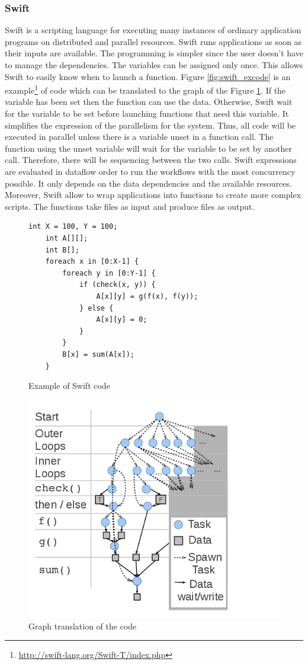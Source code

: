 \subsubsection{Swift}
Swift \cite{ZHCFL2007} \cite{WHWCK2011} is a scripting language for executing many instances of ordinary application programs on distributed and parallel resources.
Swift runs applications as soon as their inputs are available.
The programming is simpler since the user doesn't have to manage the dependencies.
The variables can be assigned only once.
This allows Swift to easily know when to launch a function.
Figure \ref{fig:swift_excode} is an example\footnote{\url{http://swift-lang.org/Swift-T/index.php}} of code which can be translated to the graph of the Figure \ref{fig:swift_exgraph}.
If the variable has been set then the function can use the data.
Otherwise, Swift wait for the variable to be set before launching functions that need this variable.
It simplifies the expression of the parallelism for the system.
Thus, all code will be executed in parallel unless there is a variable unset in a function call.
The function using the unset variable will wait for the variable to be set by another call.
Therefore, there will be sequencing between the two calls.
Swift expressions are evaluated in dataflow order to run the workflows with the most concurrency possible.
It only depends on the data dependencies and the available resources.
Moreover, Swift allow to wrap applications into functions to create more complex scripts.
The functions take files as input and produce files as output.

\begin{figure}[H]
\begin{multicols}{2}
	\begin{lstlisting}[basicstyle=\ttfamily, tabsize=3, frame=single]
	int X = 100, Y = 100;
	int A[][];
	int B[];
	foreach x in [0:X-1] {
		foreach y in [0:Y-1] {
			if (check(x, y)) {
				A[x][y] = g(f(x), f(y));
			} else {
				A[x][y] = 0;
			}
		}
		B[x] = sum(A[x]);
	}
	\end{lstlisting}
	\caption{Example of Swift code \label{fig:swift_excode}}
	\centering
	\includegraphics[width=.45\textwidth]{swift_spawngraph}
	\caption{Graph translation of the code\label{fig:swift_exgraph}}
\end{multicols}
\end{figure}

